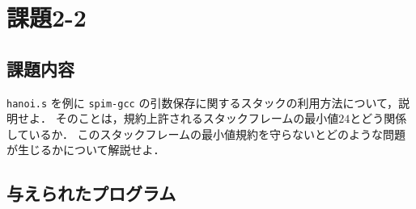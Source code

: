 \documentclass[a4j,11pt]{jarticle}
\begin{document}
\section{課題2-2}
\subsection{課題内容}
{\tt hanoi.s} を例に {\tt spim-gcc} の引数保存に関するスタックの利用方法について，説明せよ． 
そのことは，規約上許されるスタックフレームの最小値$24$とどう関係しているか． 
このスタックフレームの最小値規約を守らないとどのような問題が生じるかについて解説せよ．

\subsection{与えられたプログラム}
\end{document}
